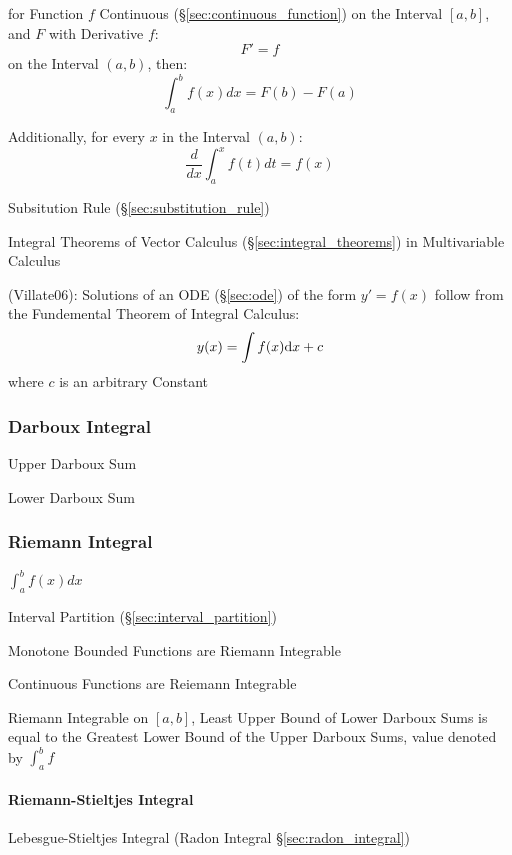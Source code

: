 for Function $f$ Continuous (\S\ref{sec:continuous_function}) on the Interval
$[a,b]$, and $F$ with Derivative $f$:
\[
  F' = f
\]
on the Interval $(a,b)$, then:
\[
  \int_a^b f(x) dx = F(b) - F(a)
\]

Additionally, for every $x$ in the Interval $(a,b)$:
\[
  \frac{d}{dx}\int^x_a f(t) dt = f(x)
\]

\fist Subsitution Rule (\S\ref{sec:substitution_rule})

\fist Integral Theorems of Vector Calculus
(\S\ref{sec:integral_theorems}) in Multivariable Calculus

(Villate06): Solutions of an ODE (\S\ref{sec:ode}) of the form $y' = f(x)$
follow from the Fundemental Theorem of Integral Calculus:
\[
  y(x) = \int f(x) \mathrm{d}x + c
\]
where $c$ is an arbitrary Constant



\subsubsection{Darboux Integral}\label{sec:darboux_integral}

Upper Darboux Sum

Lower Darboux Sum



\subsubsection{Riemann Integral}\label{sec:riemann_integral}

$\int_a^b f(x) dx$

Interval Partition (\S\ref{sec:interval_partition})

Monotone Bounded Functions are Riemann Integrable

Continuous Functions are Reiemann Integrable

Riemann Integrable on $[a,b]$, Least Upper Bound of Lower Darboux Sums
is equal to the Greatest Lower Bound of the Upper Darboux Sums, value
denoted by $\int_a^b f$



\paragraph{Riemann-Stieltjes Integral}\label{sec:riemann_stieltjes}\hfill

\fist Lebesgue-Stieltjes Integral (Radon Integral \S\ref{sec:radon_integral})



